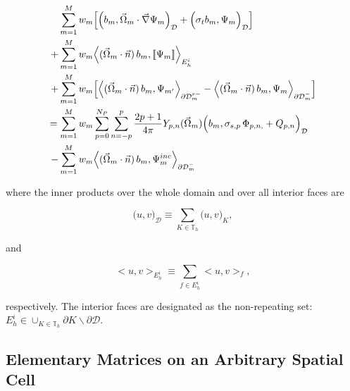 \begin{equation}
\label{eq::Sn_DGFEM_variational_form}
\begin{aligned}
\sum\displaylimits_{m=1}^M w_m& \Big[  \Big(  b_m, \vec{\Omega}_m \cdot   \vec{\nabla} \Psi_{m} \Big)_{\mathcal{D}} + \Big( \sigma_t  b_m,  \Psi_{m} \Big)_{\mathcal{D}}  \Big]  \\
+ \sum\displaylimits_{m=1}^M w_m& \Big< ( \vec{\Omega}_m \cdot \vec{n} ) \, b_m, [\![ \Psi_m]\!]  \Big>_{E_h^i} \\
+ \sum\displaylimits_{m=1}^M w_m& \Big[ \Big< ( \vec{\Omega}_m \cdot \vec{n} ) \, b_m, {\Psi}_{m'}  \Big>_{\partial \mathcal{D}_m^{r-}} -  \Big< ( \vec{\Omega}_m \cdot \vec{n} ) \, b_m, {\Psi}_m  \Big>_{\partial \mathcal{D}_m^-}   \Big] \\
= \sum\displaylimits_{m=1}^M w_m&     \sum_{p=0}^{N_P} \sum_{n=-p}^{p} \frac{2p + 1}{4 \pi}  Y_{p,n} (  \vec{\Omega}_m )  \Big(   b_m, \sigma_{s,p} \,  \Phi_{p,n,} +  Q_{p,n} \Big)_{\mathcal{D}}  \\
- \sum\displaylimits_{m=1}^M w_m&   \Big< ( \vec{\Omega}_m \cdot \vec{n} ) \, b_m, {\Psi}_m^{inc}  \Big>_{\partial \mathcal{D}_m^- }
\end{aligned}
\end{equation}

\noindent where the inner products over the whole domain and over all interior faces are

\begin{equation}
\label{eq::Sn_DGFEM_vol_inner_prod}
\Big( u, v \Big)_{\mathcal{D}} \equiv \sum_{K \in \mathbb{T}_h}  \Big( u, v \Big)_{K} ,
\end{equation}

\noindent and 

\begin{equation}
\label{eq::Sn_DGFEM_surf_inner_prod}
\Big< u, v \Big>_{E_h^i} \equiv \sum_{f \in E_h^i}  \Big< u, v \Big>_{f} ,
\end{equation}

\noindent respectively. The interior faces are designated as the non-repeating set: $E_h^i \in \cup_{K \in  \mathbb{T}_h} \partial K \backslash \partial \mathcal{D}$.

\subsection{Elementary Matrices on an Arbitrary Spatial Cell}
\label{sec::Sn_Spatial_Matrices}

